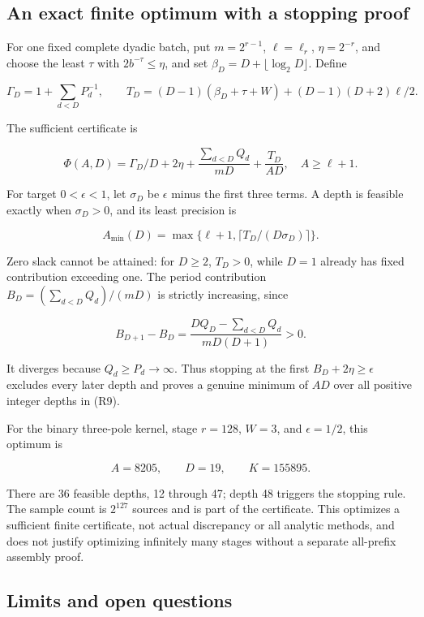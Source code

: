 \documentclass[11pt,a4paper]{article}
\begin{document}
\subsection{An exact finite optimum with a stopping
proof}\label{an-exact-finite-optimum-with-a-stopping-proof}

For one fixed complete dyadic batch, put \(m=2^{r-1}\), \(\ell=\ell_r\),
\(\eta=2^{-r}\), and choose the least \(\tau\) with
\(2b^{-\tau}\le\eta\), and set \(\beta_D=D+\lfloor\log_2D\rfloor\).
Define

\[
\Gamma_D=1+\sum_{d< D}P_d^{-1},\qquad
T_D=(D-1)(\beta_D+\tau+W)+(D-1)(D+2)\ell/2.
\]

The sufficient certificate is

\[
\Phi(A,D)=\Gamma_D/D+2\eta+
 \frac{\sum_{d< D}Q_d}{mD}+\frac{T_D}{AD},
\quad A\ge\ell+1.
\tag{R9}
\]

For target \(0< \epsilon< 1\), let \(\sigma_D\) be \(\epsilon\) minus
the first three terms. A depth is feasible exactly when \(\sigma_D>0\),
and its least precision is

\[
A_{\min}(D)=\max\lbrace \ell+1,\lceil T_D/(D\sigma_D)\rceil\rbrace .
\]

Zero slack cannot be attained: for \(D\ge2\), \(T_D>0\), while \(D=1\)
already has fixed contribution exceeding one. The period contribution
\(B_D=(\sum_{d< D}Q_d)/(mD)\) is strictly increasing, since

\[
B_{D+1}-B_D=
\frac{DQ_D-\sum_{d< D}Q_d}{mD(D+1)}>0.
\]

It diverges because \(Q_d\ge P_d\to\infty\). Thus stopping at the first
\(B_D+2\eta\ge\epsilon\) excludes every later depth and proves a genuine
minimum of \(AD\) over all positive integer depths in (R9).

For the binary three-pole kernel, stage \(r=128\), \(W=3\), and
\(\epsilon=1/2\), this optimum is

\[
A=8205,\qquad D=19,\qquad K=155895.
\]

There are 36 feasible depths, 12 through 47; depth 48 triggers the
stopping rule. The sample count is \(2^{127}\) sources and is part of
the certificate. This optimizes a sufficient finite certificate, not
actual discrepancy or all analytic methods, and does not justify
optimizing infinitely many stages without a separate all-prefix assembly
proof.

\subsection{Limits and open
questions}\label{limits-and-open-questions}
\end{document}

